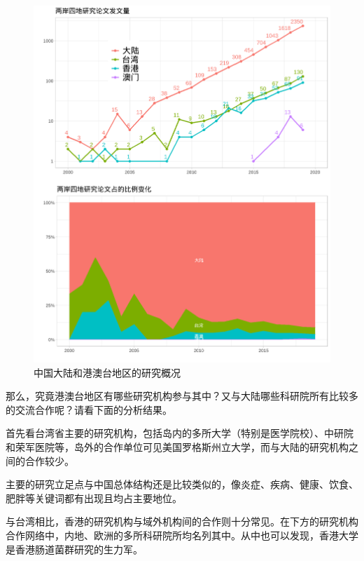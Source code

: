\documentclass[]{ctexbook}
\begin{document}
\begin{figure}
\includegraphics[width=1\linewidth]{plots/mainland-hongkong-macao-taiwan-1} \caption{中国大陆和港澳台地区的研究概况}\label{fig:mainland-hongkong-macao-taiwan}
\end{figure}

那么，究竟港澳台地区有哪些研究机构参与其中？又与大陆哪些科研院所有比较多的交流合作呢？请看下面的分析结果。

首先看台湾省主要的研究机构，包括岛内的多所大学（特别是医学院校）、中研院和荣军医院等，岛外的合作单位可见美国罗格斯州立大学，而与大陆的研究机构之间的合作较少。

\hypertarget{htmlwidget-7f04e5565dad629984fc}{}

主要的研究立足点与中国总体结构还是比较类似的，像炎症、疾病、健康、饮食、肥胖等关键词都有出现且均占主要地位。

\hypertarget{htmlwidget-a91464da40b7393b5e9e}{}

与台湾相比，香港的研究机构与域外机构间的合作则十分常见。在下方的研究机构合作网络中，内地、欧洲的多所科研院所均名列其中。从中也可以发现，香港大学是香港肠道菌群研究的生力军。
\end{document}

